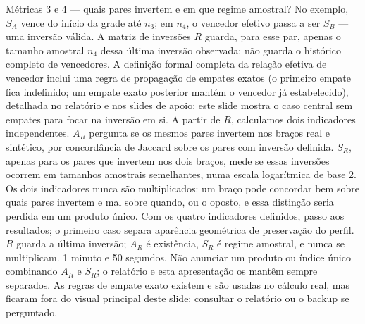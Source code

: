 \begin{frame}{Métricas 3 e 4 — quais pares invertem e em que regime amostral?}
  \speakernotes
    {No exemplo, $S_A$ vence do início da grade até $n_3$; em $n_4$, o vencedor efetivo passa a ser $S_B$ --- uma inversão válida. A matriz de inversões $R$ guarda, para esse par, apenas o tamanho amostral $n_4$ dessa última inversão observada; não guarda o histórico completo de vencedores. A definição formal completa da relação efetiva de vencedor inclui uma regra de propagação de empates exatos (o primeiro empate fica indefinido; um empate exato posterior mantém o vencedor já estabelecido), detalhada no relatório e nos slides de apoio; este slide mostra o caso central sem empates para focar na inversão em si. A partir de $R$, calculamos dois indicadores independentes. $A_R$ pergunta se os mesmos pares invertem nos braços real e sintético, por concordância de Jaccard sobre os pares com inversão definida. $S_R$, apenas para os pares que invertem nos dois braços, mede se essas inversões ocorrem em tamanhos amostrais semelhantes, numa escala logarítmica de base 2. Os dois indicadores nunca são multiplicados: um braço pode concordar bem sobre quais pares invertem e mal sobre quando, ou o oposto, e essa distinção seria perdida em um produto único.}
    {Com os quatro indicadores definidos, passo aos resultados; o primeiro caso separa aparência geométrica de preservação do perfil.}
    {$R$ guarda a última inversão; $A_R$ é existência, $S_R$ é regime amostral, e nunca se multiplicam.}
    {1 minuto e 50 segundos.}
    {Não anunciar um produto ou índice único combinando $A_R$ e $S_R$; o relatório e esta apresentação os mantêm sempre separados. As regras de empate exato existem e são usadas no cálculo real, mas ficaram fora do visual principal deste slide; consultar o relatório ou o backup se perguntado.}
\end{frame}

